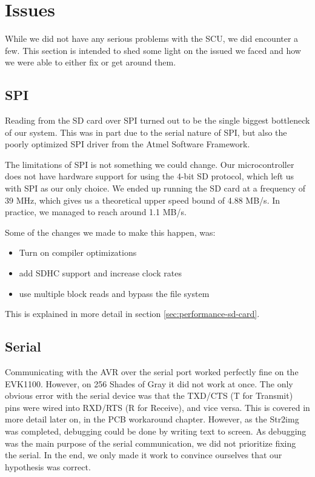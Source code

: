 \section{Issues}
While we did not have any serious problems with the SCU, we did
encounter a few. This section is intended to shed some light on the
issued we faced and how we were able to either fix or get around them. 

\subsection{SPI}
\label{sec:avr-spi-issues}
Reading from the \ac{SD} card over \ac{SPI} turned out to be the single biggest
bottleneck of our system. This was in part due to the serial nature of \ac{SPI},
but also the poorly optimized \ac{SPI} driver from the Atmel Software Framework.

The limitations of \ac{SPI} is not something we could change. Our
microcontroller does not have hardware support for using the 4-bit \ac{SD}
protocol, which left us with \ac{SPI} as our only choice. We ended up running
the \ac{SD} card at a frequency of 39 MHz, which gives us a theoretical upper
speed bound of 4.88 MB/s. In practice, we managed to reach around 1.1 MB/s.

Some of the changes we made to make this happen, was: \vspace{-1.0em}
\begin{itemize}
  \item Turn on compiler optimizations \vspace{-1.0em}
  \item add SDHC support and increase clock rates\vspace{-1.0em}
  \item use multiple block reads and bypass the file system
\end{itemize}

This is explained in more detail in section \ref{sec:performance-sd-card}.

\subsection{Serial}
\label{sec:avr-serial-issues}
Communicating with the AVR over the serial port worked perfectly fine on the
EVK1100. However, on 256 Shades of Gray it did not work at once. The
only obvious error with the serial device was that the TXD/CTS (T for Transmit)
pins were wired into RXD/RTS (R for Receive), and vice versa. This is covered 
in more detail later on, in the PCB workaround chapter. However, 
as the Str2img was completed, debugging could be done by writing text to screen.
As debugging was the main purpose of the serial communication, we did not prioritize
fixing the serial. In the end, we only made it work to convince ourselves 
that our hypothesis was correct.

